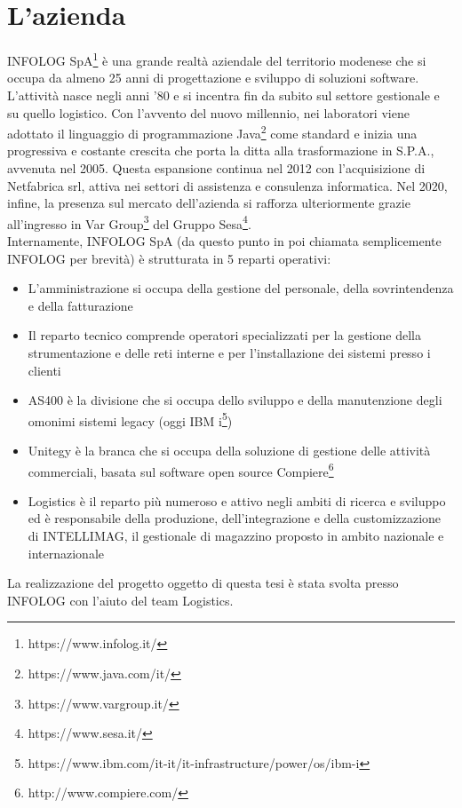 \chapter{L'azienda}\label{c:company}

INFOLOG SpA\footnote{https://www.infolog.it/} è una grande realtà aziendale del territorio modenese che si occupa da almeno 25 anni di progettazione e sviluppo di soluzioni software.
L'attività nasce negli anni '80 e si incentra fin da subito sul settore gestionale e su quello logistico.
Con l'avvento del nuovo millennio, nei laboratori viene adottato il linguaggio di programmazione Java\footnote{https://www.java.com/it/} come standard e inizia una progressiva e costante crescita
che porta la ditta alla trasformazione in S.P.A., avvenuta nel 2005.
Questa espansione continua nel 2012 con l'acquisizione di Netfabrica srl, attiva nei settori di assistenza e consulenza informatica.
Nel 2020, infine, la presenza sul mercato dell'azienda si rafforza ulteriormente grazie all'ingresso in Var Group\footnote{https://www.vargroup.it/} del Gruppo Sesa\footnote{https://www.sesa.it/}.
\\
Internamente, INFOLOG SpA (da questo punto in poi chiamata semplicemente INFOLOG per brevità) è strutturata in 5 reparti operativi:
\begin{itemize}
    \item L'amministrazione si occupa della gestione del personale, della sovrintendenza e della fatturazione
    \item Il reparto tecnico comprende operatori specializzati per la gestione della strumentazione e delle reti interne e per l'installazione dei sistemi presso i clienti
    \item AS400 è la divisione che si occupa dello sviluppo e della manutenzione degli omonimi sistemi legacy (oggi IBM i\footnote{https://www.ibm.com/it-it/it-infrastructure/power/os/ibm-i})
    \item Unitegy è la branca che si occupa della soluzione di gestione delle attività commerciali, basata sul software open source Compiere\footnote{http://www.compiere.com/}
    \item Logistics è il reparto più numeroso e attivo negli ambiti di ricerca e sviluppo ed è responsabile della produzione, dell'integrazione e della customizzazione di INTELLIMAG, il gestionale di magazzino proposto in ambito nazionale e internazionale
\end{itemize}
La realizzazione del progetto oggetto di questa tesi è stata svolta presso INFOLOG con l'aiuto del team Logistics.